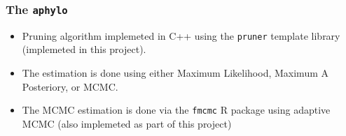 \documentclass[aspectratio=169, 10pt]{beamer}\usepackage[]{graphicx}\usepackage[]{color}
\newcommand{\aphylopkg}[0]{\texttt{aphylo}}
\begin{document}
\begin{frame}[label=aphylopkg]
\frametitle{The \aphylopkg{}}

\begin{itemize}
\item Pruning algorithm implemeted in C++ using the \texttt{pruner} template library (implemeted in this project).
\item The estimation is done using either Maximum Likelihood, Maximum A Posteriory, or MCMC.
\item The MCMC estimation is done via the \texttt{fmcmc} R package using adaptive MCMC
(also implemeted as part of this project)
\end{itemize}

\hyperlink{aphylographicalviewcont}{}
\end{frame}
\end{document}
